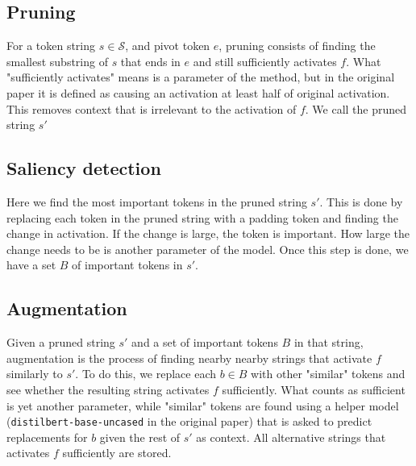 \subsection{Pruning}
For a token string $s\in\mathcal S$, and pivot token $e$, 
pruning consists of finding the smallest substring of $s$ that ends in $e$ 
and still sufficiently activates $f$.
What "sufficiently activates" means is a parameter of the method, 
but in the original paper it is defined as causing an activation at least
half of original activation.
This removes context that is irrelevant to the activation of $f$.
We call the pruned string $s'$

\subsection{Saliency detection}
Here we find the most important tokens in the pruned string $s'$.
This is done by replacing each token in the pruned string 
with a padding token and finding the change in activation.
If the change is large, the token is important.
How large the change needs to be is another parameter of the model.
Once this step is done, we have a set $B$ of important tokens in $s'$.

\subsection{Augmentation}
Given a pruned string $s'$ and a set of important tokens $B$ in that string, 
augmentation is the process of finding nearby nearby strings 
that activate $f$ similarly to $s'$.
To do this, we replace each $b\in B$ with other "similar" tokens and 
see whether the resulting string activates $f$ sufficiently.
What counts as sufficient is yet another parameter, 
while "similar" tokens are found using a helper model 
(\verb|distilbert-base-uncased| in the original paper) 
that is asked to predict replacements for $b$ 
given the rest of $s'$ as context.
All alternative strings that activates $f$ sufficiently are stored.

